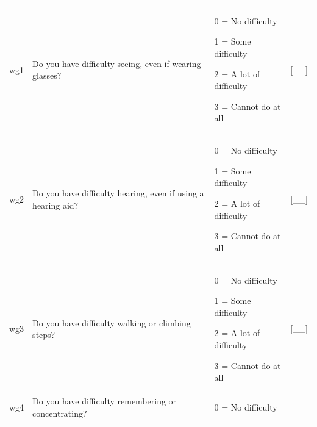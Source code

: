 \documentclass[12pt,a4paper]{book}
\theoremstyle{definition}
\theoremstyle{definition}
\theoremstyle{definition}
\theoremstyle{remark}
\begin{document}
\begin{longtable}[]{@{}llll@{}}
\toprule
\begin{minipage}[t]{0.24\columnwidth}\raggedright
wg1\strut
\end{minipage} & \begin{minipage}[t]{0.24\columnwidth}\raggedright
Do you have difficulty seeing, even if wearing glasses?\strut
\end{minipage} & \begin{minipage}[t]{0.24\columnwidth}\raggedright
0 = No difficulty

1 = Some difficulty

2 = A lot of difficulty

3 = Cannot do at all\strut
\end{minipage} & \begin{minipage}[t]{0.24\columnwidth}\raggedright
{[}\_\_{]}\strut
\end{minipage}\tabularnewline
\begin{minipage}[t]{0.24\columnwidth}\raggedright
wg2\strut
\end{minipage} & \begin{minipage}[t]{0.24\columnwidth}\raggedright
Do you have difficulty hearing, even if using a hearing aid?\strut
\end{minipage} & \begin{minipage}[t]{0.24\columnwidth}\raggedright
0 = No difficulty

1 = Some difficulty

2 = A lot of difficulty

3 = Cannot do at all\strut
\end{minipage} & \begin{minipage}[t]{0.24\columnwidth}\raggedright
{[}\_\_{]}\strut
\end{minipage}\tabularnewline
\begin{minipage}[t]{0.24\columnwidth}\raggedright
wg3\strut
\end{minipage} & \begin{minipage}[t]{0.24\columnwidth}\raggedright
Do you have difficulty walking or climbing steps?\strut
\end{minipage} & \begin{minipage}[t]{0.24\columnwidth}\raggedright
0 = No difficulty

1 = Some difficulty

2 = A lot of difficulty

3 = Cannot do at all\strut
\end{minipage} & \begin{minipage}[t]{0.24\columnwidth}\raggedright
{[}\_\_{]}\strut
\end{minipage}\tabularnewline
\begin{minipage}[t]{0.24\columnwidth}\raggedright
wg4\strut
\end{minipage} & \begin{minipage}[t]{0.24\columnwidth}\raggedright
Do you have difficulty remembering or concentrating?\strut
\end{minipage} & \begin{minipage}[t]{0.24\columnwidth}\raggedright
0 = No difficulty


\end{minipage}
\end{longtable}
\end{document}
